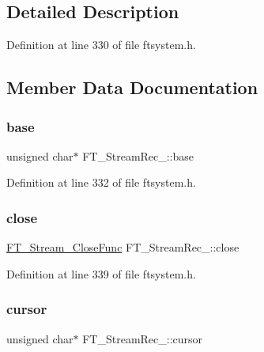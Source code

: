 \subsection{Detailed Description}


Definition at line 330 of file ftsystem.\+h.



\subsection{Member Data Documentation}
\mbox{\label{struct_f_t___stream_rec___a7b406cb9a60c5a8b4bd8d04b7a23cfee}} 
\subsubsection{\texorpdfstring{base}{base}}
{\footnotesize\ttfamily unsigned char$\ast$ F\+T\+\_\+\+Stream\+Rec\+\_\+\+::base}



Definition at line 332 of file ftsystem.\+h.

\mbox{\label{struct_f_t___stream_rec___a7d7c7a1d7de8f580d7ad66efe89defa9}} 
\subsubsection{\texorpdfstring{close}{close}}
{\footnotesize\ttfamily \mbox{\hyperlink{ftsystem_8h_a9ab6151513724c69e5493d520d43135f}{F\+T\+\_\+\+Stream\+\_\+\+Close\+Func}} F\+T\+\_\+\+Stream\+Rec\+\_\+\+::close}



Definition at line 339 of file ftsystem.\+h.

\mbox{\label{struct_f_t___stream_rec___ab7dbbad87d8b6d0178771a06e1ce8b4d}} 
\subsubsection{\texorpdfstring{cursor}{cursor}}
{\footnotesize\ttfamily unsigned char$\ast$ F\+T\+\_\+\+Stream\+Rec\+\_\+\+::cursor}



